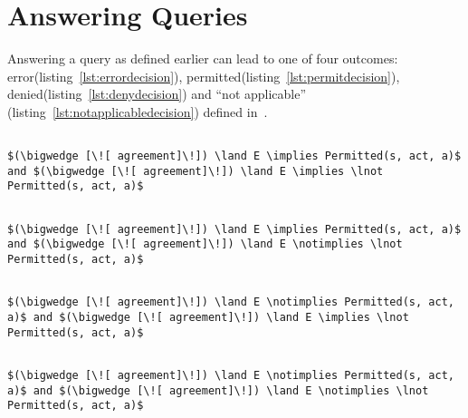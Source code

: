 \section{Answering Queries}

Answering a query as defined earlier can lead to one of four outcomes: error(listing~\ref{lst:errordecision}), permitted(listing~\ref{lst:permitdecision}), denied(listing~\ref{lst:denydecision}) and ``not applicable'' (listing~\ref{lst:notapplicabledecision}) defined in~\cite{Tschantz}.

\lstset{mathescape, language=AST} 
\begin{lstlisting}[frame=single, caption={Answerable Queries: Error},label={lst:errordecision}]

$(\bigwedge [\![ agreement]\!]) \land E \implies Permitted(s, act, a)$ and $(\bigwedge [\![ agreement]\!]) \land E \implies \lnot Permitted(s, act, a)$

\end{lstlisting}

\lstset{mathescape, language=AST} 
\begin{lstlisting}[frame=single, caption={Answerable Queries: Permit},label={lst:permitdecision}]

$(\bigwedge [\![ agreement]\!]) \land E \implies Permitted(s, act, a)$ and $(\bigwedge [\![ agreement]\!]) \land E \notimplies \lnot Permitted(s, act, a)$

\end{lstlisting}

\lstset{mathescape, language=AST} 
\begin{lstlisting}[frame=single, caption={Answerable Queries: Deny},label={lst:denydecision}]

$(\bigwedge [\![ agreement]\!]) \land E \notimplies Permitted(s, act, a)$ and $(\bigwedge [\![ agreement]\!]) \land E \implies \lnot Permitted(s, act, a)$

\end{lstlisting}

\lstset{mathescape, language=AST} 
\begin{lstlisting}[frame=single, caption={Answerable Queries: Not Applicable},label={lst:notapplicabledecision}]

$(\bigwedge [\![ agreement]\!]) \land E \notimplies Permitted(s, act, a)$ and $(\bigwedge [\![ agreement]\!]) \land E \notimplies \lnot Permitted(s, act, a)$

\end{lstlisting}



